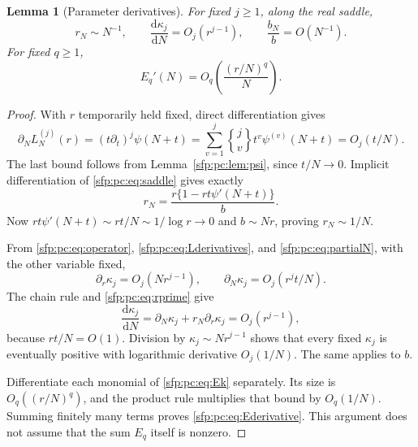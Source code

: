 \documentclass[11pt,letterpaper]{article}
\numberwithin{equation}{section}
\newtheorem{lemma}[theorem]{Lemma}
\theoremstyle{definition}\newtheorem{definition}[theorem]{Definition}
\theoremstyle{remark}\newtheorem{remark}[theorem]{Remark}
\newcommand{\stwo}[2]{\genfrac{\{} {\}}{0pt}{}{#1}{#2}}
\begin{document}
\begin{lemma}[Parameter derivatives]\label{sfp:pc:lem:parameter}
For fixed $j\geq1$, along the real saddle,
\begin{equation}\label{sfp:pc:eq:kappaderivative}
 r_N\sim N^{-1},\qquad
 \frac{\mathrm d\kappa_j}{\mathrm dN}=O_j(r^{j-1}),
 \qquad \frac{b_N}{b}=O(N^{-1}).
\end{equation}
For fixed $q\geq1$,
\begin{equation}\label{sfp:pc:eq:Ederivative}
 E_q'(N)=O_q\left(\frac{(r/N)^q}{N}\right).
\end{equation}
\end{lemma}
\begin{proof}
With $r$ temporarily held fixed, direct differentiation gives
\begin{equation}\label{sfp:pc:eq:partialN}
 \partial_NL_N^{(j)}(r)
  =(t\partial_t)^j\psi(N+t)
  =\sum_{v=1}^j\stwo jv t^v\psi^{(v)}(N+t)
  =O_j(t/N).
\end{equation}
The last bound follows from Lemma~\ref{sfp:pc:lem:psi}, since $t/N\to0$.
Implicit differentiation of \eqref{sfp:pc:eq:saddle} gives exactly
\begin{equation}\label{sfp:pc:eq:rprime}
 r_N=\frac{r\{1-rt\psi'(N+t)\}}{b}.
\end{equation}
Now $rt\psi'(N+t)\sim rt/N\sim1/\log r\to0$ and
$b\sim Nr$, proving $r_N\sim1/N$.

From \eqref{sfp:pc:eq:operator}, \eqref{sfp:pc:eq:Lderivatives}, and
\eqref{sfp:pc:eq:partialN}, with the other variable fixed,
\[
 \partial_r\kappa_j=O_j(Nr^{j-1}),\qquad
 \partial_N\kappa_j=O_j(r^jt/N).
\]
The chain rule and \eqref{sfp:pc:eq:rprime} give
\[
 \frac{\mathrm d\kappa_j}{\mathrm dN}
 =\partial_N\kappa_j+r_N\partial_r\kappa_j
 =O_j(r^{j-1}),
\]
because $rt/N=O(1)$. Division by
$\kappa_j\sim Nr^{j-1}$ shows that every fixed $\kappa_j$
is eventually positive with logarithmic derivative $O_j(1/N)$.
The same applies to $b$.

Differentiate each monomial of \eqref{sfp:pc:eq:Ek} separately.
Its size is $O_q((r/N)^q)$, and the product rule multiplies
that bound by $O_q(1/N)$. Summing finitely many terms proves
\eqref{sfp:pc:eq:Ederivative}. This argument does not assume that the
sum $E_q$ itself is nonzero.
\end{proof}
\end{document}
